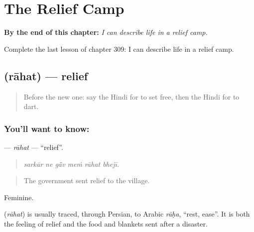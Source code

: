
\chapter{The Relief Camp}
\label{ch:hi-the-relief-camp}

\begin{chapteropening}
\textbf{By the end of this chapter:} \emph{I can describe life in a relief camp.}

Complete the last lesson of chapter 309: I can describe life in a relief camp.
\end{chapteropening}

\section[\texorpdfstring{\hi{राहत} (rāhat)}{राहत (rāhat)}]{ (rāhat) — relief}

\label{lesson:HI-C309-rahat}



\begin{quote}
Before the new one: say the Hindi for to set free, then the Hindi for to dart.
\end{quote}

\subsection*{You'll want to know: }
\textbf{} — \emph{rāhat} — \textquotedblleft{}relief\textquotedblright{}.

\begin{quote}
     
\end{quote}

\begin{quote}
\emph{sarkār ne gā̃v meṁ rāhat bhejī.}
\end{quote}

\begin{quote}
The government sent relief to the village.
\end{quote}

Feminine.

\begin{cousinweb}
\textbf{} (\emph{rāhat}) is usually traced, through Persian, to Arabic \emph{rāḥa}, \textquotedblleft{}rest, ease\textquotedblright{}. It is both the feeling of relief and the food and blankets sent after a disaster.
\end{cousinweb}

